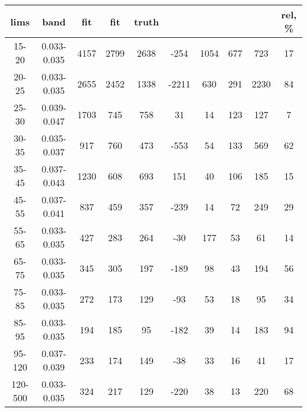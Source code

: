 \documentclass{beamer}
\begin{document}
\begin{frame}
\begin{table}[h]
\begin{center}
\begin{tabular}{|c|c|c|c|c|c|c|c|c|c|}
    lims & band & fit & fit & truth &       &      &     &      & rel, \% \\ \hline
    15-20 & 0.033-0.035 & 4157 & 2799 & 2638 & -254 & 1054 & 677 & 723 & 17  \\ \hline
    20-25 & 0.033-0.035 & 2655 & 2452 & 1338 & -2211 & 630 & 291 & 2230 & 84  \\ \hline
    25-30 & 0.039-0.047 & 1703 & 745 & 758 & 31 & 14 & 123 & 127 & 7  \\ \hline
    30-35 & 0.035-0.037 & 917 & 760 & 473 & -553 & 54 & 133 & 569 & 62  \\ \hline
    35-45 & 0.037-0.043 & 1230 & 608 & 693 & 151 & 40 & 106 & 185 & 15  \\ \hline
    45-55 & 0.037-0.041 & 837 & 459 & 357 & -239 & 14 & 72 & 249 & 29  \\ \hline
    55-65 & 0.033-0.035 & 427 & 283 & 264 & -30 & 177 & 53 & 61 & 14  \\ \hline
    65-75 & 0.033-0.035 & 345 & 305 & 197 & -189 & 98 & 43 & 194 & 56  \\ \hline
    75-85 & 0.033-0.035 & 272 & 173 & 129 & -93 & 53 & 18 & 95 & 34  \\ \hline
    85-95 & 0.033-0.035 & 194 & 185 & 95 & -182 & 39 & 14 & 183 & 94  \\ \hline
    95-120 & 0.037-0.039 & 233 & 174 & 149 & -38 & 33 & 16 & 41 & 17  \\ \hline
    120-500 & 0.033-0.035 & 324 & 217 & 129 & -220 & 38 & 13 & 220 & 68  \\ \hline
  \end{tabular}
  \label{tab:systSbVar_Meth1_ELECTRON_WGamma_Endcap}
  \end{center}
\end{table}

\end{frame}
\end{document}
